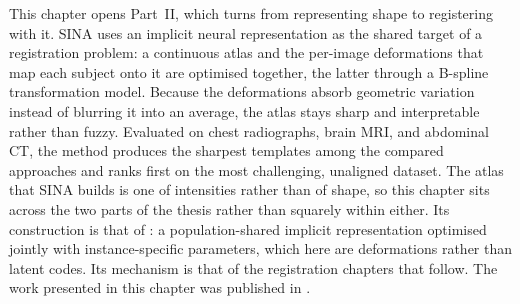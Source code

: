 This chapter opens Part~II, which turns from representing shape to registering with it. SINA uses an implicit neural representation as the shared target of a registration problem: a continuous atlas and the per-image deformations that map each subject onto it are optimised together, the latter through a B-spline transformation model. Because the deformations absorb geometric variation instead of blurring it into an average, the atlas stays sharp and interpretable rather than fuzzy. Evaluated on chest radiographs, brain MRI, and abdominal CT, the method produces the sharpest templates among the compared approaches and ranks first on the most challenging, unaligned dataset. The atlas that SINA builds is one of intensities rather than of shape, so this chapter sits across the two parts of the thesis rather than squarely within either. Its construction is that of : a population-shared implicit representation optimised jointly with instance-specific parameters, which here are deformations rather than latent codes. Its mechanism is that of the registration chapters that follow. The work presented in this chapter was published in \citep{grossbrohmer2024sina}.

    

